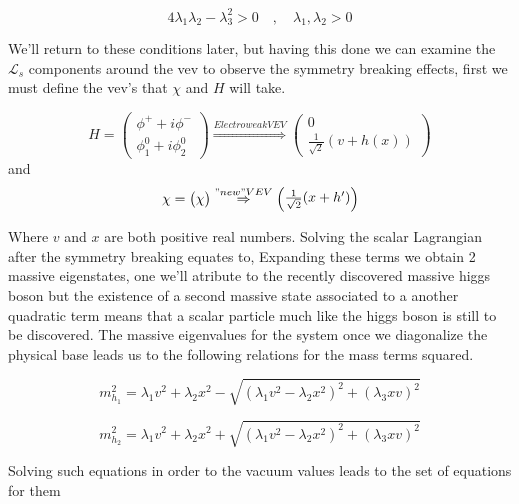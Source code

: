 \documentclass[11pt,twoside,a4paper]{article}
\begin{document}
\begin{equation}
4 \lambda_1 \lambda_2  -  \lambda_3^2 > 0 \quad , \quad \lambda_1 , \lambda_2>0
\end{equation}


We'll return to these conditions later, but having this done we can examine the $\mathcal{L}_s$ components around the vev to observe the symmetry breaking effects, first we must define the vev's that $\chi$ and $H$ will take. 


\begin{equation}
H= 
\begin{pmatrix}
\phi^+ + i  \phi^-  \\
\phi^0_1 +i  \phi_2^0 
\end{pmatrix}
\overset{Electroweak VEV}{\Rightarrow}
\begin{pmatrix}
0  \\
\frac{1}{\sqrt{2}}(v+h(x))
\end{pmatrix}
\end{equation}
and
\begin{equation}
\chi= 
\begin{pmatrix}
\chi
\end{pmatrix}
\overset{"new" VEV}{\Rightarrow}
\begin{pmatrix}
\frac{1}{\sqrt{2}}(x+h^\prime)
\end{pmatrix}
\end{equation}

Where $v$ and $x$ are both positive real numbers. Solving the scalar Lagrangian after the symmetry breaking equates to, 
Expanding these terms we obtain 2 massive eigenstates, one we'll atribute to the recently discovered massive higgs boson but the existence of a second massive state associated to a another quadratic term means that a scalar particle much like the higgs boson is still to be discovered. The massive eigenvalues for the system once we diagonalize the physical base leads us to the following relations for the mass terms squared. 

\begin{equation}
m_{h_1}^2 = \lambda_1 v^2 + \lambda_2 x^2 - \sqrt{(\lambda_1 v^2 - \lambda_2 x^2)^2 + (\lambda_3 x v)^2}
\end{equation}

\begin{equation}
m_{h_2}^2 = \lambda_1 v^2 + \lambda_2 x^2 + \sqrt{(\lambda_1 v^2 - \lambda_2 x^2)^2 + (\lambda_3 x v)^2}
\end{equation}


Solving such equations in order to the vacuum values leads to the set of equations for them
\end{document}
